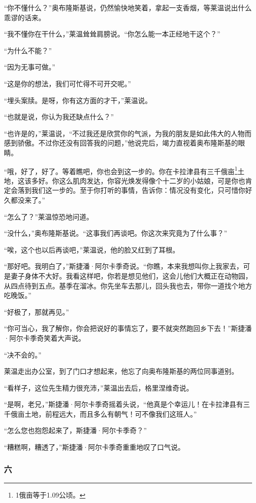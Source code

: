 \par “你不懂什么？”奥布隆斯基说，仍然愉快地笑着，拿起一支香烟，等莱温说出什么乖谬的话来。
\par “我不懂你在干什么，”莱温耸耸肩膀说。“你怎么能一本正经地干这个？”
\par “为什么不能？”
\par “因为无事可做。”
\par “这是你的想法，我们可忙得不可开交呢。”
\par “埋头案牍。是呀，你有这方面的才干，”莱温说。
\par “也就是说，你认为我还缺点什么？”
\par “也许是的，”莱温说，“不过我还是欣赏你的气派，为我的朋友是如此伟大的人物而感到骄傲。不过你还没有回答我的问题，”他说完后，竭力直视着奥布隆斯基的眼睛。
\par “哦，好了，好了。等着瞧吧，你也会到这一步的。你在卡拉津县有三千俄亩\footnote{1俄亩等于1.09公顷。}土地，这该多好。你这么肌肉发达，你容光焕发得像个十二岁的小姑娘，可是你也肯定会落到我们这一步的。至于你打听的事情，告诉你：情况没有变化，只可惜你好久都没来了。”
\par “怎么了？”莱温惊恐地问道。
\par “没什么，”奥布隆斯基说。“这事我们再谈吧。你这次来究竟为了什么事？”
\par “唉，这个也以后再谈吧，”莱温说，他的脸又红到了耳根。
\par “那好吧。我明白了，”斯捷潘·阿尔卡季奇说。“你瞧，本来我想叫你上我家去，可是妻子身体不大好。我看这样吧，你若是想见他们，这会儿他们大概正在动物园，从四点待到五点。基季在溜冰。你先坐车去那儿，回头我也去，带你一道找个地方吃晚饭。”
\par “好极了，那就再见。”
\par “你可当心，我了解你，你会把说好的事情忘了，要不就突然跑回乡下去！”斯捷潘·阿尔卡季奇笑着大声说。
\par “决不会的。”
\par 莱温走出办公室，到了门口才想起来，他忘了向奥布隆斯基的两位同事道别。
\par “看样子，这位先生精力很充沛，”莱温出去后，格里涅维奇说。
\par “是啊，老兄，”斯捷潘·阿尔卡季奇摇着头说，“他真是个幸运儿！在卡拉津县有三千俄亩土地，前程远大，而且多么有朝气！可不像我们这班人。”
\par “怎么您也抱怨起来了，斯捷潘·阿尔卡季奇？”
\par “糟糕啊，糟透了，”斯捷潘·阿尔卡季奇重重地叹了口气说。

\subsubsection*{六}




